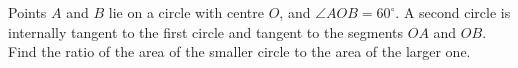 Points $A$ and $B$ lie on a circle with centre $O$, and $\angle AOB=60^\circ$. A second circle is internally tangent to the first circle and tangent to the segments $OA$ and $OB$. Find the ratio of the area of the smaller circle to the area of the larger one.
